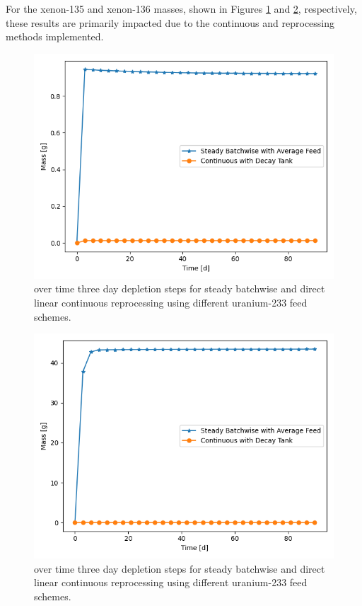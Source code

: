 For the xenon-135 and xenon-136 masses, shown in Figures \ref{fig:prev-cur-xe135-plot} and \ref{fig:prev-cur-xe136-plot}, respectively, these results are primarily impacted due to the continuous and reprocessing methods implemented.

\begin{figure}[H]
  \centering
  \includegraphics[scale=0.7]{images/prev-cur-xe135.png}
  \caption{ over time three day depletion steps for steady batchwise and direct linear continuous reprocessing using different uranium-233 feed schemes.}
   \label{fig:prev-cur-xe135-plot}
\end{figure}

\begin{figure}[H]
  \centering
  \includegraphics[scale=0.7]{images/prev-cur-xe136.png}
  \caption{ over time three day depletion steps for steady batchwise and direct linear continuous reprocessing using different uranium-233 feed schemes.}
   \label{fig:prev-cur-xe136-plot}
\end{figure}

